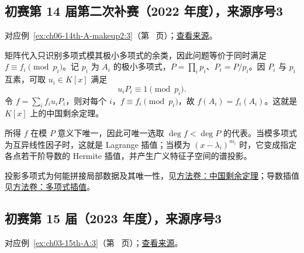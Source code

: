 \documentclass[UTF8,12pt,a4paper,fontset=fandol]{ctexart}
\begin{document}
\subsection{初赛第 14 届第二次补赛（2022 年度），来源序号3}\label{ans:ch06-14th-A-makeup2:3}\label{pr:ch06-14th-A-makeup2:3}

对应例~\ref{ex:ch06-14th-A-makeup2:3}（第~\pageref{ex:ch06-14th-A-makeup2:3} 页）；\href{https://github.com/lzxcr/cmc-mathematics/blob/64916fa1fdbc3e444a652eca204d5669058ee321/src/problems/preliminary/14-makeup2/03.md}{查看来源}。

\begin{solve}

矩阵代入只识别多项式模其极小多项式的余类，因此问题等价于同时满足 $f\equiv f_i\pmod{p_i}$。记 $p_i$ 为 $A_i$ 的极小多项式，$P=\prod_i p_i$、$P_i=P/p_i$。因 $P_i$ 与 $p_i$ 互素，可取 $u_i\in K[x]$ 满足
\[
u_iP_i\equiv1\pmod{p_i}.
\]
令 $f=\sum_i f_i u_iP_i$，则对每个 $i$，$f\equiv f_i\pmod{p_i}$，故 $f(A_i)=f_i(A_i)$。这就是 $K[x]$ 上的中国剩余定理。

\end{solve}

\begin{remark}[方法与条件]

所得 $f$ 在模 $P$ 意义下唯一，因此可唯一选取 $\deg f<\deg P$ 的代表。当模多项式为互异线性因子时，这就是 Lagrange 插值；当模为 $(x-\lambda_i)^{m_i}$ 时，它变成指定各点若干阶导数的 Hermite 插值，并产生广义特征子空间的谱投影。

投影多项式为何能拼接局部数据及其唯一性，见\hyperref[app:algebra-crt]{方法卷：中国剩余定理}；导数插值见\hyperref[app:algebra-interpolation]{方法卷：多项式插值}。

\end{remark}

\subsection{初赛第 15 届（2023 年度），来源序号3}\label{ans:ch03-15th-A:3}\label{pr:ch03-15th-A:3}

对应例~\ref{ex:ch03-15th-A:3}（第~\pageref{ex:ch03-15th-A:3} 页）；\href{https://github.com/lzxcr/cmc-mathematics/blob/64916fa1fdbc3e444a652eca204d5669058ee321/src/problems/preliminary/15/03.md}{查看来源}。
\end{document}
